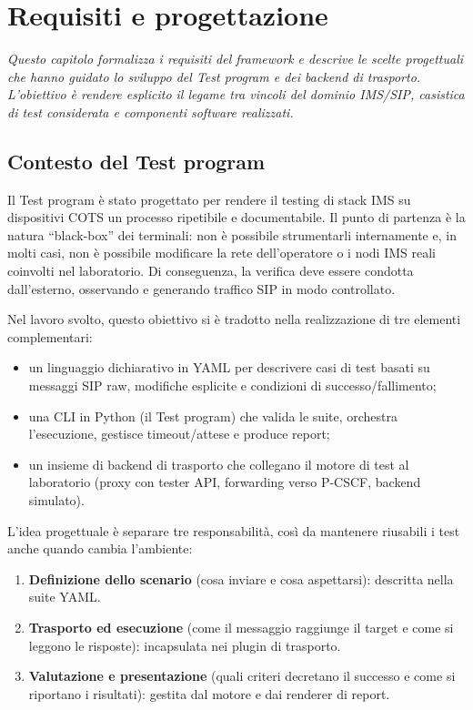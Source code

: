 \chapter{Requisiti e progettazione}
\begin{minipage}{12cm}\textit{Questo capitolo formalizza i requisiti del framework e descrive le scelte progettuali che hanno guidato lo sviluppo del \emph{Test program} e dei backend di trasporto. L'obiettivo \`e rendere esplicito il legame tra vincoli del dominio IMS/SIP, casistica di test considerata e componenti software realizzati.}\end{minipage}
\vspace*{1cm}

\section{Contesto del Test program}
Il Test program \`e stato progettato per rendere il testing di stack IMS su dispositivi COTS un processo ripetibile e documentabile. Il punto di partenza \`e la natura ``black-box'' dei terminali: non \`e possibile strumentarli internamente e, in molti casi, non \`e possibile modificare la rete dell'operatore o i nodi IMS reali coinvolti nel laboratorio. Di conseguenza, la verifica deve essere condotta dall'esterno, osservando e generando traffico SIP in modo controllato.

Nel lavoro svolto, questo obiettivo si \`e tradotto nella realizzazione di tre elementi complementari:
\begin{itemize}
	\item un linguaggio dichiarativo in YAML per descrivere casi di test basati su messaggi SIP raw, modifiche esplicite e condizioni di successo/fallimento;
	\item una CLI in Python (il Test program) che valida le suite, orchestra l'esecuzione, gestisce timeout/attese e produce report;
	\item un insieme di backend di trasporto che collegano il motore di test al laboratorio (proxy con tester API, forwarding verso P-CSCF, backend simulato).
\end{itemize}

L'idea progettuale \`e separare tre responsabilit\`a, cos\`i da mantenere riusabili i test anche quando cambia l'ambiente:
\begin{enumerate}
	\item \textbf{Definizione dello scenario} (cosa inviare e cosa aspettarsi): descritta nella suite YAML.
	\item \textbf{Trasporto ed esecuzione} (come il messaggio raggiunge il target e come si leggono le risposte): incapsulata nei plugin di trasporto.
	\item \textbf{Valutazione e presentazione} (quali criteri decretano il successo e come si riportano i risultati): gestita dal motore e dai renderer di report.
\end{enumerate}

